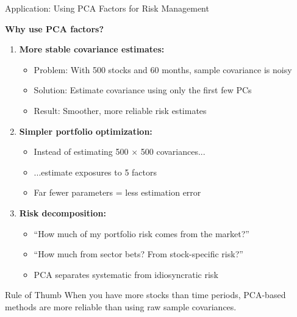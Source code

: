 \documentclass[10pt]{beamer}
\begin{document}
\begin{frame}{Application: Using PCA Factors for Risk Management}

  \textbf{Why use PCA factors?}

  \vspace{0.5em}
  \begin{enumerate}
    \item \textbf{More stable covariance estimates:}
    \begin{itemize}
      \item Problem: With 500 stocks and 60 months, sample covariance is noisy
      \item Solution: Estimate covariance using only the first few PCs
      \item Result: Smoother, more reliable risk estimates
    \end{itemize}

    \vspace{0.5em}
    \item \textbf{Simpler portfolio optimization:}
    \begin{itemize}
      \item Instead of estimating 500 $\times$ 500 covariances...
      \item ...estimate exposures to 5 factors
      \item Far fewer parameters = less estimation error
    \end{itemize}

    \vspace{0.5em}
   \item \textbf{Risk decomposition:}
    \begin{itemize}
      \item ``How much of my portfolio risk comes from the market?''
      \item ``How much from sector bets? From stock-specific risk?''
      \item PCA separates systematic from idiosyncratic risk
    \end{itemize}
  \end{enumerate}

  \vspace{0.5em}
  \begin{block}{Rule of Thumb}
    When you have more stocks than time periods, PCA-based methods are more reliable than using raw sample covariances.
  \end{block}
\end{frame}

\end{document}
